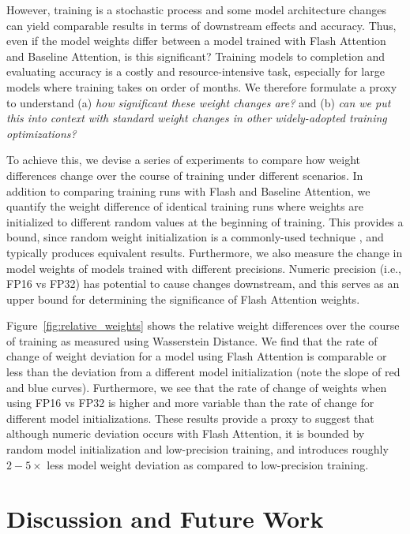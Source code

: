 However, training is a stochastic process and some model architecture changes can yield comparable results in terms of downstream effects and accuracy. Thus, even if the model weights differ between a model trained with Flash Attention and Baseline Attention, is this significant? Training models to completion and evaluating accuracy is a costly and resource-intensive task, especially for large models where training takes on order of months. We therefore formulate a proxy to understand (a) \textit{how significant these weight changes are?} and (b) \textit{can we put this into context with standard weight changes in other widely-adopted training optimizations?}

To achieve this, we devise a series of experiments to compare how weight differences change over the course of training under different scenarios. In addition to comparing training runs with Flash and Baseline Attention, we quantify the weight difference of identical training runs where weights are initialized to different random values at the beginning of training. This provides a bound, since random weight initialization is a commonly-used technique \cite{scabini2022improving}, and typically produces equivalent results. Furthermore, we also measure the change in model weights of models trained with different precisions. Numeric precision (i.e., FP16 vs FP32) has potential to cause changes downstream, and this serves as an upper bound for determining the significance of Flash Attention weights.

Figure~\ref{fig:relative_weights} shows the relative weight differences over the course of training as measured using Wasserstein Distance. We find that the rate of change of weight deviation for a model using Flash Attention is comparable or less than the deviation from a different model initialization (note the slope of red and blue curves). Furthermore, we see that the rate of change of weights when using FP16 vs FP32 is higher and more variable than the rate of change for different model initializations. These results provide a proxy to suggest that although numeric deviation occurs with Flash Attention, it is bounded by random model initialization and low-precision training, and introduces roughly $2-5\times$ less model weight deviation as compared to low-precision training.

\section{Discussion and Future Work}

